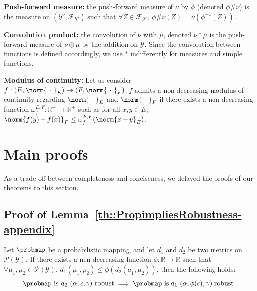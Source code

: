 \textbf{Push-forward measure:} the push-forward measure of $\nu$ by $\phi$ (denoted $\phi \# \nu$) is the measure on $(\mathcal{Y'},\mathcal{F}_{\mathcal{Y'}})$ such that $\forall Z \in \mathcal{F}_{\mathcal{Y'}}, \ \phi \# \nu(Z) = \nu(\phi^{-1}(Z)) $.

\textbf{Convolution product:} the convolution of $\nu$ with $\mu$, denoted $\nu * \mu$ is the push-forward measure of $\nu \otimes \mu$ by the addition on $\mathcal{Y}$. Since the convolution between functions is defined accordingly, we use $*$ indifferently for measures and simple functions. 

\textbf{Modulus of continuity:} Let us consider $f:(E,\norm{\ \cdot\ }_E)\rightarrow(F,\norm{\ \cdot\ }_F)$. $f$ admits a non-decreasing modulus of continuity regarding $\norm{\ \cdot\ }_E$ and $\norm{\ \cdot\ }_F$ if there exists a non-decreasing function $\omega^{E,F}_f:\mathbb{R^+}\rightarrow\mathbb{R^+}$ such as for all $x,y\in E$, $\norm{f(y) - f(x)}_F \leq \omega^{E,F}_f(\norm{x - y}_E)$.


\section{Main proofs}

As a trade-off between completeness and conciseness, we delayed the proofs of our theorems to this section.

\subsection{Proof of Lemma~\ref{th::PropimpliesRobustness-appendix}}

\begin{lemma}
\label{th::PropimpliesRobustness-appendix}Let $\probmap$ be a probabilistic mapping, and
let  $d_{1}$ and $d_{2}$ be two metrics on $\mathcal{P}(\mathcal{Y})$.
If there exists a non decreasing function $ \phi: \mathbb{R} \to \mathbb{R}$ such that  $\forall \mu_1,\mu_2 \in \mathcal{P}(\mathcal{Y})$, $d_{1}(\mu_1,\mu_2) \leq \phi(d_{2}(\mu_1,\mu_2)) $, then the following holds: 
$$\probmap \text{ is } d_{2}\text{-}(\alpha, \epsilon, \gamma)\text{-robust} \implies \probmap \text{ is }d_{1}\text{-}(\alpha, \phi(\epsilon), \gamma)\text{-robust}$$
\end{lemma}

